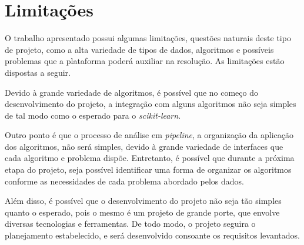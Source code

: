 

\section{Limitações}
    \label{sec:limintacoes}

    O trabalho apresentado possui algumas limitações, questões naturais deste tipo de projeto, como a alta variedade de tipos de dados, algoritmos e possíveis problemas que a plataforma poderá auxiliar na resolução. As limitações estão dispostas a seguir.

    Devido à grande variedade de algoritmos, é possível que no começo do desenvolvimento do projeto, a integração com alguns algoritmos não seja simples de tal modo como o esperado para o \textit{scikit-learn}.

    Outro ponto é que o processo de análise em \textit{pipeline}, a organização da aplicação dos algoritmos, não será simples, devido à grande variedade de interfaces que cada algoritmo e problema dispõe. Entretanto, é possível que durante a próxima etapa do projeto, seja possível identificar uma forma de organizar os algoritmos conforme as necessidades de cada problema abordado pelos dados.

    Além disso, é possível que o desenvolvimento do projeto não seja tão simples quanto o esperado, pois o mesmo é um projeto de grande porte, que envolve diversas tecnologias e ferramentas. De todo modo, o projeto seguira o planejamento estabelecido, e será desenvolvido consoante os requisitos levantados.
